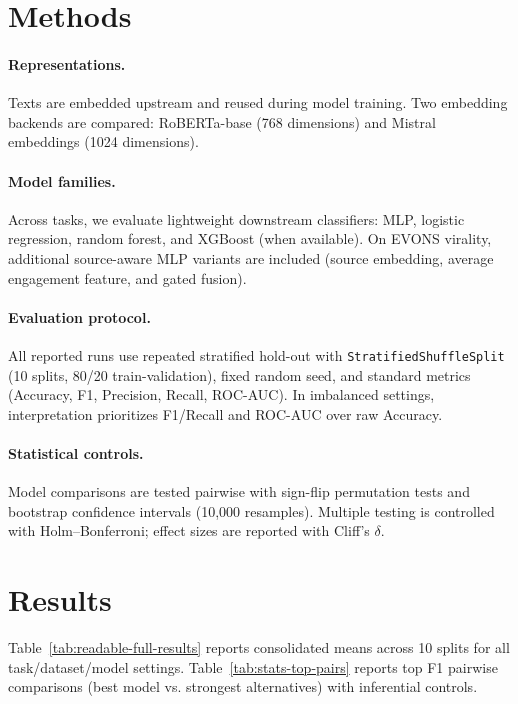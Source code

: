\documentclass[10pt, a4paper]{article}
\begin{document}
\section{Methods}
\label{sec:methods}

\paragraph{Representations.}
Texts are embedded upstream and reused during model training. Two embedding backends are compared: RoBERTa-base (768 dimensions) and Mistral embeddings (1024 dimensions).

\paragraph{Model families.}
Across tasks, we evaluate lightweight downstream classifiers: MLP, logistic regression, random forest, and XGBoost (when available). On EVONS virality, additional source-aware MLP variants are included (source embedding, average engagement feature, and gated fusion).

\paragraph{Evaluation protocol.}
All reported runs use repeated stratified hold-out with \texttt{StratifiedShuffleSplit} (10 splits, 80/20 train-validation), fixed random seed, and standard metrics (Accuracy, F1, Precision, Recall, ROC-AUC). In imbalanced settings, interpretation prioritizes F1/Recall and ROC-AUC over raw Accuracy.

\paragraph{Statistical controls.}
Model comparisons are tested pairwise with sign-flip permutation tests and bootstrap confidence intervals (10,000 resamples). Multiple testing is controlled with Holm--Bonferroni; effect sizes are reported with Cliff's $\delta$.

\section{Results}
\label{sec:results}

Table~\ref{tab:readable-full-results} reports consolidated means across 10 splits for all task/dataset/model settings. Table~\ref{tab:stats-top-pairs} reports top F1 pairwise comparisons (best model vs. strongest alternatives) with inferential controls.
\end{document}
